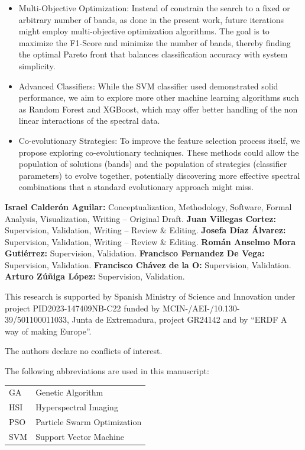 \documentclass[ASNA,twocolumn]{USG}
\providecommand{\backmatter}{}
\begin{document}
\begin{itemize}
    \item Multi-Objective Optimization: Instead of constrain the search to a fixed or arbitrary number of bands, as done in the present work, future iterations might employ multi-objective optimization algorithms. The goal is to maximize the F1-Score and minimize the number of bands, thereby finding the optimal Pareto front that balances classification accuracy with system simplicity.
    \item Advanced Classifiers: While the SVM classifier used demonstrated solid performance, we aim to explore more other machine learning algorithms such as Random Forest and XGBoost, which may offer better handling of the non linear interactions of the spectral data. 
    \item Co-evolutionary Strategies: To improve the feature selection process itself, we propose exploring co-evolutionary techniques. These methods could allow the population of solutions (bands) and the population of strategies (classifier parameters) to evolve together, potentially discovering more effective spectral combinations that a standard evolutionary approach might miss.
\end{itemize}
\backmatter

\textbf{Israel Calderón Aguilar:} Conceptualization, Methodology, Software, Formal Analysis, Visualization, Writing – Original Draft. \textbf{Juan Villegas Cortez:} Supervision, Validation, Writing – Review \& Editing. \textbf{Josefa Díaz Álvarez:} Supervision, Validation, Writing – Review \& Editing. \textbf{Román Anselmo Mora Gutiérrez:} Supervision, Validation. \textbf{Francisco Fernandez De Vega:} Supervision, Validation. \textbf{Francisco Chávez de la O:} Supervision, Validation. \textbf{Arturo Zúñiga López:} Supervision, Validation.


This research is supported by Spanish Ministry of Science and Innovation under project PID2023-147409NB-C22 funded by MCIN-/AEI-/10.130-39/501100011033, Junta de Extremadura, project GR24142 and by “ERDF A way of making Europe”.

The authors declare no conflicts of interest.

The following abbreviations are used in this manuscript:
\\
\noindent 
\begin{tabular}{@{}ll}
GA & Genetic Algorithm\\
HSI & Hyperspectral Imaging\\
PSO & Particle Swarm Optimization\\
SVM & Support Vector Machine
\end{tabular}


\end{document}
